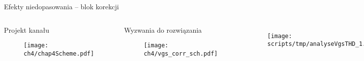 \begin{frame}{Efekty niedopasowania -- blok korekcji}
\begin{columns}

    \begin{block}{
        Projekt kanału}
        \begin{figure}[H]
            \centering
            \texttt{[image: ch4/chap4Scheme.pdf]}
        \end{figure} 
        \end{block}

        \begin{block}{
            Wyzwania do rozwiązania}
            \begin{figure}[H]
                \centering
                \texttt{[image: ch4/vgs\_corr\_sch.pdf]} 
            \end{figure}   
            \end{block}



    \begin{columns}

    \begin{figure}[H]
        \centering
        \texttt{[image: scripts/tmp/analyseVgsTHD\_1.pdf]}
    \end{figure} 
    \begin{figure}[H]
        \centering
        \texttt{[image: scripts/tmp/analyseVgsTHD\_2.pdf]}
    \end{figure} 
    \end{columns}   

    \begin{columns}

    \begin{figure}[H]
        \centering
        \texttt{[image: ch4/vgs\_corr0.pdf]}
    \end{figure} 
    \begin{figure}[H]
        \centering
        \texttt{[image: ch4/vgs\_corr1.pdf]}
    \end{figure} 
    \end{columns}   
\end{columns}  
\end{frame}


